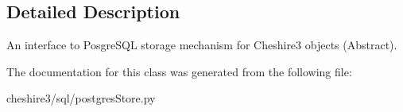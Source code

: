 \subsection{Detailed Description}
\begin{DoxyVerb}An interface to PosgreSQL storage mechanism for Cheshire3 objects (Abstract).\end{DoxyVerb}
 

The documentation for this class was generated from the following file\-:\begin{DoxyCompactItemize}
\item 
cheshire3/sql/postgres\-Store.\-py\end{DoxyCompactItemize}
